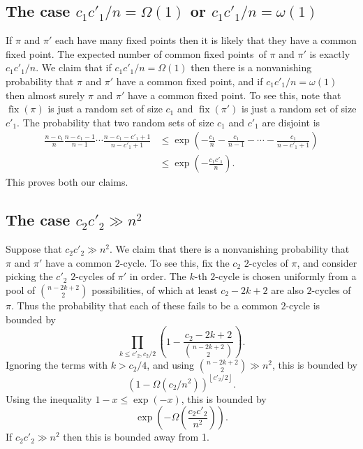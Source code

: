 \documentclass[ALCO,ThmDefs,Unicode,epreuves]{cedram}
\DeclareMathOperator{\fix}{fix}
\newcommand\floor[1]{\left\lfloor{#1}\right\rfloor}
\begin{document}
\subsection{The case \texorpdfstring{$c_1 c'_1/n = \Omega(1)$}{c1 c1' / n = Omega(1)} or \texorpdfstring{$c_1 c'_1/n = \omega(1)$}{c1 c1' = omega(1)}} \label{subsec:fixed-points}

If $\pi$ and $\pi'$ each have many fixed points then it is likely that they have a common fixed point. The expected number of common fixed points\ of $\pi$ and $\pi'$ is exactly $c_1 c'_1 / n$. We claim that if $c_1 c'_1 / n = \Omega(1)$ then there is a nonvanishing probability that $\pi$ and $\pi'$ have a common fixed point, and if $c_1 c'_1 / n = \omega(1)$ then almost surely $\pi$ and $\pi'$ have a common fixed point. To see this, note that $\fix(\pi)$ is just a random set of size $c_1$ and $\fix(\pi')$ is just a random set of size $c'_1$. The probability that two random sets of size $c_1$ and $c'_1$ are disjoint is
\begin{align*}
 \frac{n-c_1}{n} \frac{n-c_1-1}{n-1} \cdots \frac{n-c_1-c'_1+1}{n-c'_1+1}
 &\leq \exp\left(
 - \frac{c_1}{n} - \frac{c_1}{n-1} - \cdots - \frac{c_1}{n-c'_1+1}
 \right) \\
 &\leq \exp\left(
 - \frac{c_1 c'_1}{n}
 \right).
\end{align*}
This proves both our claims.

\subsection{The case \texorpdfstring{$c_2 c'_2 \gg n^2$}{c2 c2' >> n\textasciicircum2}}

Suppose that $c_2 c'_2 \gg n^2$. We claim that there is a nonvanishing probability that $\pi$ and $\pi'$ have a common $2$-cycle. To see this, fix the $c_2$ $2$-cycles of $\pi$, and consider picking the $c'_2$ $2$-cycles of $\pi'$ in order. The $k$-th $2$-cycle is chosen uniformly from a pool of $\binom{n-2k+2}{2}$ possibilities, of which at least $c_2-2k+2$ are also $2$-cycles of $\pi$. Thus the probability that each of these fails to be a common $2$-cycle is bounded by
\[
\prod_{k \leq c'_2, c_2/2} \left( 1- \frac{c_2-2k+2}{\binom{n-2k+2}{2}} \right).
\]
Ignoring the terms with $k > c_2/4$, and using $\binom{n-2k+2}{2} \gg n^2$,
this is bounded by
\[
 \left(
 1 - \Omega(c_2 / n^2)
 \right)^{\floor{c'_2/2}}.
\]
Using the inequality $1-x \leq \exp(-x)$, this is bounded by
\[
 \exp \left(-\Omega \left(\frac{c_2 c'_2}{n^2}\right)\right).
\]
If $c_2 c'_2 \gg n^2$ then this is bounded away from 1.
\end{document}
